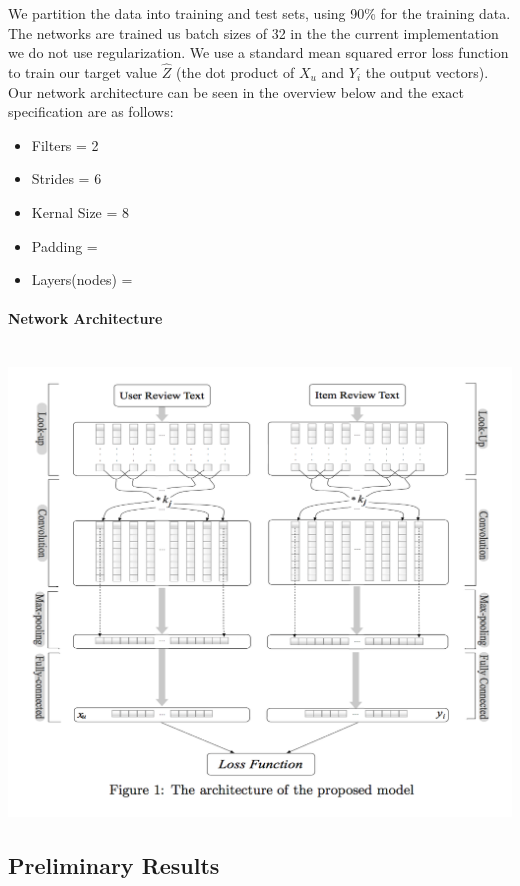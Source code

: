 \documentclass[10pt,twocolumn,letterpaper]{article}
\begin{document}
We partition the data into training and test sets, using 90\% for the training data. The networks are trained us batch sizes of 32 in the the current implementation we do not use regularization. We use a standard mean squared error loss function to train our target value $\hat{Z}$ (the dot product of $X_{u}$ and $Y_{i}$ the output vectors). Our network architecture can be seen in the overview below and the exact specification are as follows: 

\begin{itemize}
\item Filters = 2 
\item Strides = 6
\item Kernal Size = 8
\item Padding =
\item Layers(nodes) =
\end{itemize}
 

\paragraph{Network Architecture} \ \newline
\includegraphics[scale=0.38]{DeepCoNN}

\subsection{Preliminary Results}
\end{document}
